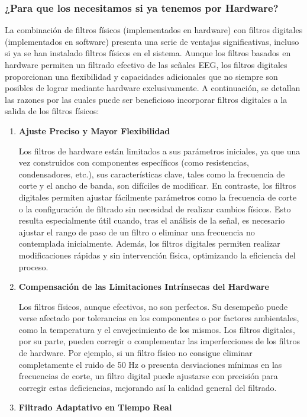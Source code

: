 \documentclass{article}
\begin{document}
\subsubsection{¿Para que los necesitamos si ya tenemos por Hardware?}
La combinación de filtros físicos (implementados en hardware) con filtros digitales (implementados en software) presenta una serie de ventajas significativas, incluso si ya se han instalado filtros físicos en el sistema. Aunque los filtros basados en hardware permiten un filtrado efectivo de las señales EEG, los filtros digitales proporcionan una flexibilidad y capacidades adicionales que no siempre son posibles de lograr mediante hardware exclusivamente. A continuación, se detallan las razones por las cuales puede ser beneficioso incorporar filtros digitales a la salida de los filtros físicos:
\begin{enumerate}
    \item \textbf{Ajuste Preciso y Mayor Flexibilidad}
    
    Los filtros de hardware están limitados a sus parámetros iniciales, ya que una vez construidos con componentes específicos (como resistencias, condensadores, etc.), sus características clave, tales como la frecuencia de corte y el ancho de banda, son difíciles de modificar. En contraste, los filtros digitales permiten ajustar fácilmente parámetros como la frecuencia de corte o la configuración de filtrado sin necesidad de realizar cambios físicos. Esto resulta especialmente útil cuando, tras el análisis de la señal, es necesario ajustar el rango de paso de un filtro o eliminar una frecuencia no contemplada inicialmente. Además, los filtros digitales permiten realizar modificaciones rápidas y sin intervención física, optimizando la eficiencia del proceso.
    \item \textbf{Compensación de las Limitaciones Intrínsecas del Hardware}
    
    Los filtros físicos, aunque efectivos, no son perfectos. Su desempeño puede verse afectado por tolerancias en los componentes o por factores ambientales, como la temperatura y el envejecimiento de los mismos. Los filtros digitales, por su parte, pueden corregir o complementar las imperfecciones de los filtros de hardware. Por ejemplo, si un filtro físico no consigue eliminar completamente el ruido de 50 Hz o presenta desviaciones mínimas en las frecuencias de corte, un filtro digital puede ajustarse con precisión para corregir estas deficiencias, mejorando así la calidad general del filtrado.
    \item \textbf{Filtrado Adaptativo en Tiempo Real}
    

\end{enumerate}
\end{document}
